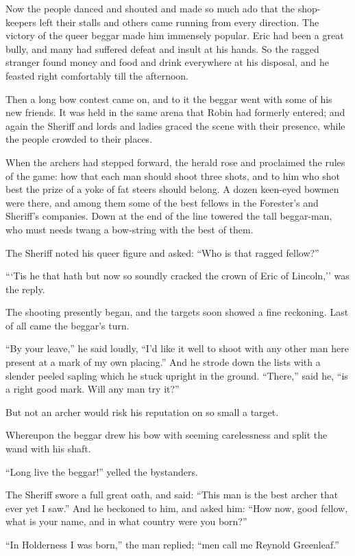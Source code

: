 Now the people danced and shouted and made so much ado that the
shop-keepers left their stalls and others came running from every
direction. The victory of the queer beggar made him immensely popular.
Eric had been a great bully, and many had suffered defeat and insult at
his hands. So the ragged stranger found money and food and drink
everywhere at his disposal, and he feasted right comfortably till the
afternoon.

Then a long bow contest came on, and to it the beggar went with some of
his new friends. It was held in the same arena that Robin had formerly
entered; and again the Sheriff and lords and ladies graced the scene
with their presence, while the people crowded to their places.

When the archers had stepped forward, the herald rose and proclaimed the
rules of the game: how that each man should shoot three shots, and to
him who shot best the prize of a yoke of fat steers should belong. A
dozen keen-eyed bowmen were there, and among them some of the best
fellows in the Forester's and Sheriff's companies. Down at the end of
the line towered the tall beggar-man, who must needs twang a bow-string
with the best of them.

The Sheriff noted his queer figure and asked: ``Who is that ragged
fellow?''

```Tis he that hath but now so soundly cracked the crown of Eric of
Lincoln,'' was the reply.

The shooting presently began, and the targets soon showed a fine
reckoning. Last of all came the beggar's turn.

``By your leave,'' he said loudly, ``I'd like it well to shoot with any
other man here present at a mark of my own placing.'' And he strode down
the lists with a slender peeled sapling which he stuck upright in the
ground. ``There,'' said he, ``is a right good mark. Will any man try
it?''

But not an archer would risk his reputation on so small a target.

Whereupon the beggar drew his bow with seeming carelessness and split
the wand with his shaft.

``Long live the beggar!'' yelled the bystanders.

The Sheriff swore a full great oath, and said: ``This man is the best
archer that ever yet I saw.'' And he beckoned to him, and asked him:
``How now, good fellow, what is your name, and in what country were you
born?''

``In Holderness I was born,'' the man replied; ``men call me Reynold
Greenleaf.''

